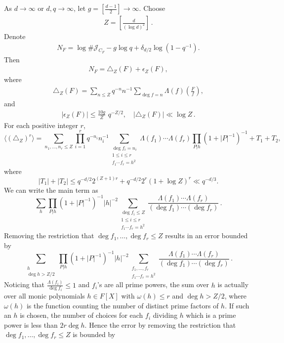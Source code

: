 \documentclass[12pt]{amsart}
\theoremstyle{plain}
\newcommand{\J}{\mathcal J}
\begin{document}
As $d \to \infty$ or $d,q \to \infty$, let $g=\left[\frac{d-1}{2}\right] \to \infty$. Choose
\begin{eqnarray} \label{5:z}
Z=\left[\frac{d}{(\log d)^2}\right]\,.
\end{eqnarray}
Denote
\begin{eqnarray} \label{5:nf} N_F=\log \# \J_{C_F}-g \log q+\delta_{d/2} \log \left(1-q^{-1}\right).\end{eqnarray}
Then
\begin{eqnarray*} N_F=\triangle_Z(F)+\epsilon_Z(F),\end{eqnarray*}
where
\begin{eqnarray*}
\triangle_Z(F)=\sum_{n \le Z}q^{-n} n^{-1} \sum_{\deg f=n} \Lambda(f) \left(\frac{F}{f}\right),
\end{eqnarray*}
and
\begin{eqnarray} \label{5:e}
|\epsilon_Z(F)| \le \frac{10g}{Z} \,\, q^{-Z/2},\quad \left|\triangle_Z(F)\right| \ll \log Z\,.
\end{eqnarray}
For each positive integer $r$,
\[\langle (\triangle_Z)^r\rangle=\sum_{n_1,\ldots,n_r \le Z} \prod_{i=1}^r q^{-n_i}n_i^{-1} \sum_{\substack{\deg f_i =n_i \\ 1 \le i \le r\\ f_1 \cdots f_r=h^2}} \Lambda(f_1) \cdots \Lambda(f_r)\prod_{P|h}\left(1+|P|^{-1}\right)^{-1}+T_1+T_2, \]
where
\[|T_1|+|T_2| \le q^{-d/2}2^{(Z+1)r} + q^{-d/2}2^r \left(1+\log Z\right)^r \ll q^{-d/3}.\]
We can write the main term as
\[\sum_{h} \prod_{P|h}\left(1+|P|^{-1}\right)^{-1} |h|^{-2} \sum_{\substack{\deg f_i \le Z \\ 1 \le i \le r\\ f_1 \cdots f_r=h^2}} \frac{\Lambda(f_1) \cdots \Lambda(f_r)}{(\deg f_1) \cdots (\deg f_r)}\,.\]
Removing the restriction that $\deg f_1, \ldots, \deg f_r \le Z$ results in an error bounded by
\[\sum_{\substack{h\\ \deg h > Z/2}} \prod_{P|h}\left(1+|P|^{-1}\right)^{-1} |h|^{-2} \sum_{\substack{f_1,\ldots,f_r \\ f_1 \cdots f_r=h^2}} \frac{\Lambda(f_1) \cdots \Lambda(f_r)}{(\deg f_1) \cdots (\deg f_r)}\,.\]
Noticing that $\frac{\Lambda(f_i)}{\deg f_i} \le 1$ and $f_i$'s are all prime powers, the sum over $h$ is actually over all monic polynomials $h \in F[X]$ with $\omega(h) \le r$ and $\deg h >Z/2$, where $\omega(h)$ is the function counting the number of distinct prime factors of $h$. If such an $h$ is chosen, the number of choices for each $f_i$ dividing $h$ which is a prime power is less than $2r \deg h$. Hence the error by removing the restriction that $\deg f_1, \ldots, \deg f_r \le Z$ is bounded by
\end{document}
